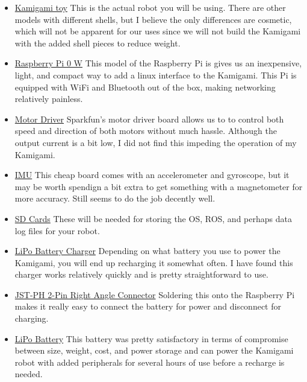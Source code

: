 \documentclass[11pt]{article}
\begin{document}
\begin{itemize}
    \item \href{https://www.amzn.com/gp/product/B06ZYVMZC5/}{Kamigami toy}
    This is the actual robot you will be using. There are other models with different shells, but I believe the only differences are cosmetic, which will not be apparent for our uses since we will not build the Kamigami with the added shell pieces to reduce weight.
    
    \item \href{https://www.adafruit.com/product/3400}{Raspberry Pi 0 W}
    This model of the Raspberry Pi is gives us an inexpensive, light, and compact way to add a linux interface to the Kamigami. This Pi is equipped with WiFi and Bluetooth out of the box, making networking relatively painless.
    
    \item \href{https://www.sparkfun.com/products/14451}{Motor Driver}
    Sparkfun's motor driver board allows us to to control both speed and direction of both motors without much hassle. Although the output current is a bit low, I did not find this impeding the operation of my Kamigami.
    
    \item \href{https://www.adafruit.com/product/4480}{IMU} This cheap board comes with an accelerometer and gyroscope, but it may be worth spendign a bit extra to get something with a magnetometer for more accuracy. Still seems to do the job decently well.
    
    \item \href{https://www.amzn.com//dp/B07TDN2G18/}{SD Cards} These will be needed for storing the OS, ROS, and perhaps data log files for your robot.
    
    \item \href{https://www.adafruit.com/product/259}{LiPo Battery Charger} Depending on what battery you use to power the Kamigami, you will end up recharging it somewhat often. I have found this charger works relatively quickly and is pretty straightforward to use.
    
    \item \href{https://www.adafruit.com/product/1862}{JST-PH 2-Pin Right Angle Connector} Soldering this onto the Raspberry Pi makes it really easy to connect the battery for power and disconnect for charging.
    
    \item \href{https://www.adafruit.com/product/258}{LiPo Battery} This battery was pretty satisfactory in terms of compromise between size, weight, cost, and power storage and can power the Kamigami robot with added peripherals for several hours of use before a recharge is needed.
    
\end{itemize}
\end{document}
